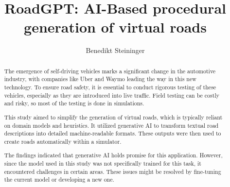 \documentclass{imc-inf}
\title{RoadGPT: AI-Based procedural generation of virtual roads}
\subtitle{}
\author{Benedikt Steininger}
\begin{document}
\frontmatter\maketitle{}


\begin{declarations}\end{declarations}



\begin{abstract}
The emergence of self-driving vehicles marks a significant change in the automotive industry, with companies like Uber and Waymo leading the way in this new technology. To ensure road safety, it is essential to conduct rigorous testing of these vehicles, especially as they are introduced into live traffic. Field testing can be costly and risky, so most of the testing is done in simulations.

This study aimed to simplify the generation of virtual roads, which is typically reliant on domain models and heuristics. It utilized generative AI to transform textual road descriptions into detailed machine-readable formats. These outputs were then used to create roads automatically within a simulator.

The findings indicated that generative AI holds promise for this application. However, since the model used in this study was not specifically trained for this task, it encountered challenges in certain areas. These issues might be resolved by fine-tuning the current model or developing a new one.
\end{abstract}



%
\tableofcontents%
\clearpage


%
\listoftables
\clearpage


%
\listoffigures
\clearpage


\mainmatter%








\end{document}
